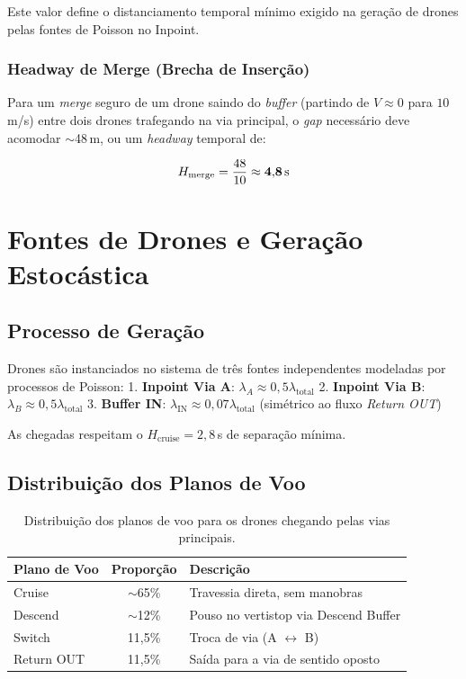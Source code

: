 \documentclass[12pt,a4paper]{article}
\begin{document}
Este valor define o distanciamento temporal mínimo exigido na geração de drones pelas fontes de Poisson no Inpoint.

\subsubsection{Headway de Merge (Brecha de Inserção)}

Para um \textit{merge} seguro de um drone saindo do \textit{buffer} (partindo de $V \approx 0$ para $10$\,m/s) entre dois drones trafegando na via principal, o \textit{gap} necessário deve acomodar $\sim$48\,m, ou um \textit{headway} temporal de:

\begin{equation}
H_{\text{merge}} = \frac{48}{10} \approx \mathbf{4{,}8 \text{\,s}}
\label{eq:headway_merge}
\end{equation}

\section{Fontes de Drones e Geração Estocástica}
\label{sec:geracao}

\subsection{Processo de Geração}

Drones são instanciados no sistema de três fontes independentes modeladas por processos de Poisson:
1. \textbf{Inpoint Via A}: $\lambda_{A} \approx 0{,}5 \lambda_{\text{total}}$
2. \textbf{Inpoint Via B}: $\lambda_{B} \approx 0{,}5 \lambda_{\text{total}}$
3. \textbf{Buffer IN}: $\lambda_{\text{IN}} \approx 0{,}07 \lambda_{\text{total}}$ (simétrico ao fluxo \textit{Return OUT})

As chegadas respeitam o $H_{\text{cruise}} = 2{,}8$\,s de separação mínima.

\subsection{Distribuição dos Planos de Voo}

\begin{table}[H]
\centering
\caption{Distribuição dos planos de voo para os drones chegando pelas vias principais.}
\label{tab:planos}
\begin{tabular}{@{}lcp{8cm}@{}}
\toprule
\textbf{Plano de Voo} & \textbf{Proporção} & \textbf{Descrição} \\
\midrule
Cruise      & $\sim$65\% & Travessia direta, sem manobras \\
Descend     & $\sim$12\% & Pouso no vertistop via Descend Buffer \\
Switch      & 11{,}5\%  & Troca de via (A $\leftrightarrow$ B) \\
Return OUT  & 11{,}5\%  & Saída para a via de sentido oposto \\
\bottomrule
\end{tabular}
\end{table}
\end{document}
